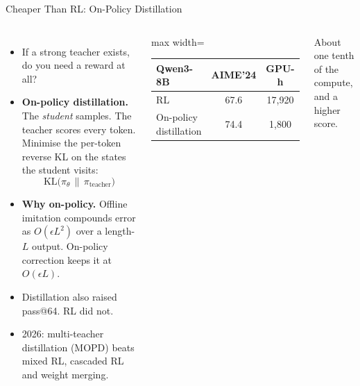 \begin{frame}{Cheaper Than RL: On-Policy Distillation}
    \begin{columns}[T,onlytextwidth]
        \begin{itemize}\itemsep0.45em
            \item If a strong teacher exists, do you need a reward at all?
            \item \textbf{On-policy distillation.} The \emph{student} samples. The teacher scores every token. Minimise the per-token reverse KL on the states the student visits:
            \[
                \mathrm{KL}\big(\pi_\theta\,\|\,\pi_{\text{teacher}}\big)
            \]
            \item \textbf{Why on-policy.} Offline imitation compounds error as $O(\epsilon L^2)$ over a length-$L$ output. On-policy correction keeps it at $O(\epsilon L)$.
            \item Distillation also raised pass@64. RL did not.
            \item 2026: multi-teacher distillation (MOPD) beats mixed RL, cascaded RL and weight merging.
        \end{itemize}
        \centering
        \small
        \begin{adjustbox}{max width=\linewidth}\begin{tabular}{lcc}
            \toprule
            \textbf{Qwen3-8B} & \textbf{AIME'24} & \textbf{GPU-h} \\
            \midrule
            RL & 67.6 & 17,920 \\
            \rowcolor{KAUSTcyan!12} On-policy distillation & 74.4 & 1,800 \\
            \bottomrule
        \end{tabular}\end{adjustbox}

        \vspace{0.8em}
        {\scriptsize About one tenth of the compute, and a higher score.}
    \end{columns}
    \vspace{0.3em}
\end{frame}

